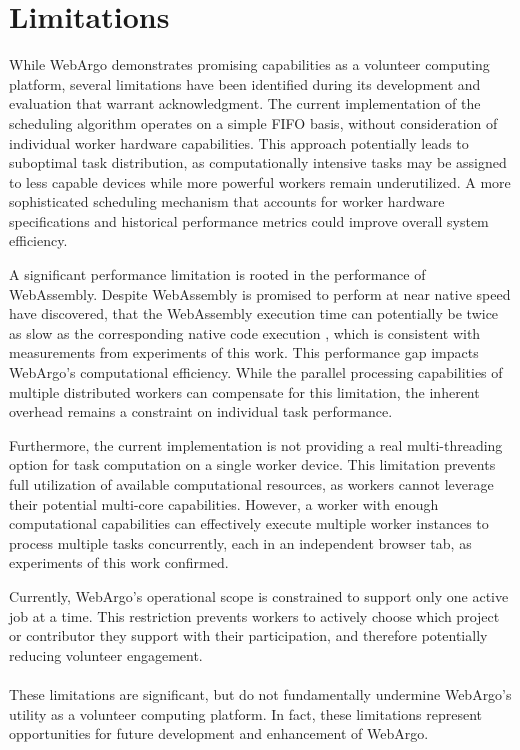 \section{Limitations}
\label{sec:conclusion:limitations}
While WebArgo demonstrates promising capabilities as a volunteer computing platform, several limitations have been identified during its development and evaluation that warrant acknowledgment. The current implementation of the scheduling algorithm operates on a simple \ac{FIFO} basis, without consideration of individual worker hardware capabilities. This approach potentially leads to suboptimal task distribution, as computationally intensive tasks may be assigned to less capable devices while more powerful workers remain underutilized. A more sophisticated scheduling mechanism that accounts for worker hardware specifications and historical performance metrics could improve overall system efficiency.

A significant performance limitation is rooted in the performance of WebAssembly. Despite WebAssembly is promised to perform at near native speed \citeauthor{background:not-so-fast} have discovered, that the WebAssembly execution time can potentially be twice as slow as the corresponding native code execution \cite{background:not-so-fast}, which is consistent with measurements from experiments of this work. This performance gap impacts WebArgo's computational efficiency. While the parallel processing capabilities of multiple distributed workers can compensate for this limitation, the inherent overhead remains a constraint on individual task performance.

Furthermore, the current implementation is not providing a real multi-threading option for task computation on a single worker device. This limitation prevents full utilization of available computational resources, as workers cannot leverage their potential multi-core capabilities. However, a worker with enough computational capabilities can effectively execute multiple worker instances to process multiple tasks concurrently, each in an independent browser tab, as experiments of this work confirmed.

Currently, WebArgo's operational scope is constrained to support only one active job at a time. This restriction prevents workers to actively choose which project or contributor they support with their participation, and therefore potentially reducing volunteer engagement.
\\~\\
These limitations are significant, but do not fundamentally undermine WebArgo's utility as a volunteer computing platform. In fact, these limitations represent opportunities for future development and enhancement of WebArgo.

